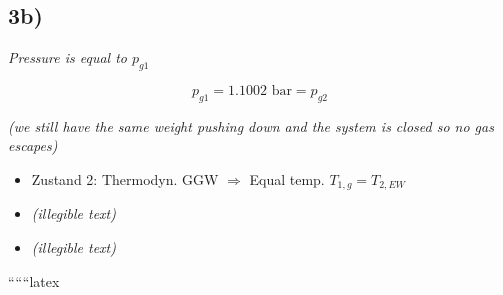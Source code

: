 

\subsection*{3b)}

\textit{Pressure is equal to $p_{g1}$}

\[
p_{g1} = 1.1002 \text{ bar} = p_{g2}
\]

\textit{(we still have the same weight pushing down and the system is closed so no gas escapes)}

\begin{itemize}
    \item Zustand 2: Thermodyn. GGW $\Rightarrow$ Equal temp. $T_{1,g} = T_{2,EW}$
    \item \textit{(illegible text)}
    \item \textit{(illegible text)}
\end{itemize}

``````latex